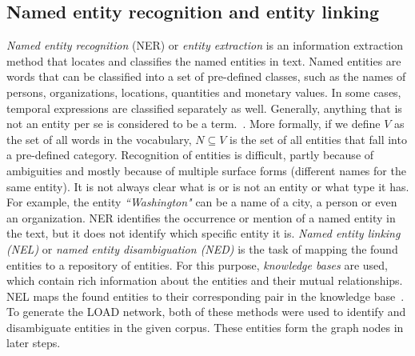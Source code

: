 \subsection{Named entity recognition and  entity linking}\label{subsec:entity_recog}
\emph{Named entity recognition} (NER) or \emph{entity extraction} is an information extraction method that locates and classifies the named entities in text. Named entities are words that can be classified into a set of pre-defined classes, such as the names of persons, organizations, locations, quantities and monetary values. In some cases, temporal expressions are classified separately as well. Generally, anything that is not an entity per se is considered to be a term.~. More formally, if we define $V$ as the set of all words in the vocabulary, $N\subseteq V$ is the set of all entities that fall into a pre-defined category.
Recognition of entities is difficult, partly because of ambiguities and mostly because of multiple surface forms (different names for the same entity).
It is not always clear what is or is not an entity or what type it has. For example, the entity \emph{``Washington"} can be a name of a city, a person or even an organization. NER identifies the occurrence or mention of a named entity in the text, but it does not identify which specific entity it is. \emph{Named entity linking (NEL)}  or \emph{named entity disambiguation (NED)}  is the task of mapping the found entities to a repository of entities. For this purpose, \emph{knowledge bases} are used, which contain rich information about the entities and their mutual relationships. NEL maps the found entities to their corresponding pair in the knowledge base~. To generate the LOAD network, both of these methods were used to identify and disambiguate entities in the given corpus.
These entities form the graph nodes in later steps. 

